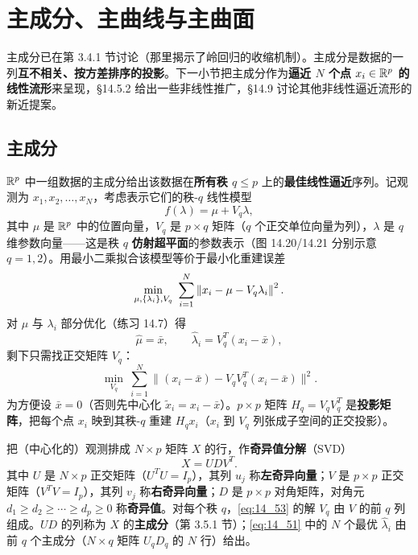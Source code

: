 \section{主成分、主曲线与主曲面}

主成分已在第 3.4.1 节讨论（那里揭示了岭回归的收缩机制）。主成分是数据的一列\textbf{互不相关、按方差排序的投影}。下一小节把主成分作为\textbf{逼近 $N$ 个点 $x_i\in\mathbb{R}^p$ 的线性流形}来呈现，§14.5.2 给出一些非线性推广，§14.9 讨论其他非线性逼近流形的新近提案。

\subsection{主成分}

$\mathbb{R}^p$ 中一组数据的主成分给出该数据在\textbf{所有秩 $q\le p$} 上的\textbf{最佳线性逼近}序列。记观测为 $x_1,x_2,\dots,x_N$，考虑表示它们的秩-$q$ 线性模型
\begin{equation}
f(\lambda) = \mu + V_q\lambda, \label{eq:14_49}
\end{equation}
其中 $\mu$ 是 $\mathbb{R}^p$ 中的位置向量，$V_q$ 是 $p\times q$ 矩阵（$q$ 个正交单位向量为列），$\lambda$ 是 $q$ 维参数向量——这是秩 $q$ \textbf{仿射超平面}的参数表示（图 14.20/14.21 分别示意 $q=1,2$）。用最小二乘拟合该模型等价于最小化重建误差
\begin{equation}
\min_{\mu,\{\lambda_i\},V_q}\ \sum_{i=1}^{N}\norm{x_i - \mu - V_q\lambda_i}^2. \label{eq:14_50}
\end{equation}
对 $\mu$ 与 $\lambda_i$ 部分优化（练习 14.7）得
\begin{equation}
\hat\mu = \bar x, \qquad \hat\lambda_i = V_q^T(x_i - \bar x), \label{eq:14_51}
\end{equation}
剩下只需找正交矩阵 $V_q$：
\begin{equation}
\min_{V_q}\ \sum_{i=1}^{N}\bigl\|(x_i-\bar x) - V_qV_q^T(x_i-\bar x)\bigr\|^2. \label{eq:14_53}
\end{equation}
为方便设 $\bar x=0$（否则先中心化 $\tilde x_i=x_i-\bar x$）。$p\times p$ 矩阵 $H_q=V_qV_q^T$ 是\textbf{投影矩阵}，把每个点 $x_i$ 映到其秩-$q$ 重建 $H_qx_i$（$x_i$ 到 $V_q$ 列张成子空间的正交投影）。

把（中心化的）观测排成 $N\times p$ 矩阵 $X$ 的行，作\textbf{奇异值分解}（SVD）
\begin{equation}
X = UDV^T. \label{eq:14_54}
\end{equation}
其中 $U$ 是 $N\times p$ 正交矩阵（$U^TU=I_p$），其列 $u_j$ 称\textbf{左奇异向量}；$V$ 是 $p\times p$ 正交矩阵（$V^TV=I_p$），其列 $v_j$ 称\textbf{右奇异向量}；$D$ 是 $p\times p$ 对角矩阵，对角元 $d_1\ge d_2\ge\cdots\ge d_p\ge 0$ 称\textbf{奇异值}。对每个秩 $q$，\eqref{eq:14_53} 的解 $V_q$ 由 $V$ 的前 $q$ 列组成。$UD$ 的列称为 $X$ 的\textbf{主成分}（第 3.5.1 节）；\eqref{eq:14_51} 中的 $N$ 个最优 $\hat\lambda_i$ 由前 $q$ 个主成分（$N\times q$ 矩阵 $U_qD_q$ 的 $N$ 行）给出。

